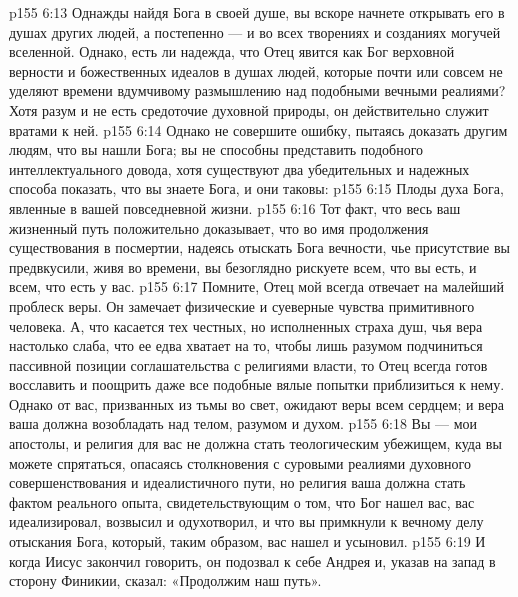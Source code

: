 \vs p155 6:13 Однажды найдя Бога в своей душе, вы вскоре начнете открывать его в душах других людей, а постепенно --- и во всех творениях и созданиях могучей вселенной. Однако, есть ли надежда, что Отец явится как Бог верховной верности и божественных идеалов в душах людей, которые почти или совсем не уделяют времени вдумчивому размышлению над подобными вечными реалиями? Хотя разум и не есть средоточие духовной природы, он действительно служит вратами к ней.
\vs p155 6:14 Однако не совершите ошибку, пытаясь доказать другим людям, что вы нашли Бога; вы не способны представить подобного интеллектуального довода, хотя существуют два убедительных и надежных способа показать, что вы знаете Бога, и они таковы:
\vs p155 6:15 \bibnobreakspace Плоды духа Бога, явленные в вашей повседневной жизни.
\vs p155 6:16 \pc {}\bibnobreakspace Тот факт, что весь ваш жизненный путь положительно доказывает, что во имя продолжения существования в посмертии, надеясь отыскать Бога вечности, чье присутствие вы предвкусили, живя во времени, вы безоглядно рискуете всем, что вы есть, и всем, что есть у вас.
\vs p155 6:17 \pc Помните, Отец мой всегда отвечает на малейший проблеск веры. Он замечает физические и суеверные чувства примитивного человека. А, что касается тех честных, но исполненных страха душ, чья вера настолько слаба, что ее едва хватает на то, чтобы лишь разумом подчиниться пассивной позиции соглашательства с религиями власти, то Отец всегда готов восславить и поощрить даже все подобные вялые попытки приблизиться к нему. Однако от вас, призванных из тьмы во свет, ожидают веры всем сердцем; и вера ваша должна возобладать над телом, разумом и духом.
\vs p155 6:18 Вы --- мои апостолы, и религия для вас не должна стать теологическим убежищем, куда вы можете спрятаться, опасаясь столкновения с суровыми реалиями духовного совершенствования и идеалистичного пути, но религия ваша должна стать фактом реального опыта, свидетельствующим о том, что Бог нашел вас, вас идеализировал, возвысил и одухотворил, и что вы примкнули к вечному делу отыскания Бога, который, таким образом, вас нашел и усыновил.
\vs p155 6:19 \pc И когда Иисус закончил говорить, он подозвал к себе Андрея и, указав на запад в сторону Финикии, сказал: «Продолжим наш путь».
